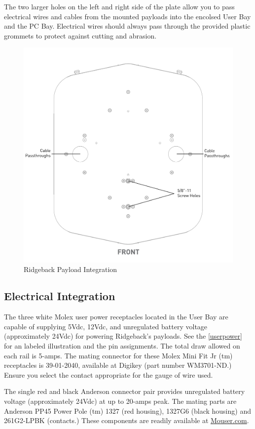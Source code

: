\documentclass[]{clearpath-latex/clearpath-manual}
\begin{document}
The two larger holes on the left and right side of the plate allow you to pass electrical wires and cables from the mounted payloads into the encolsed User Bay and the PC Bay.  Electrical wires should always pass through the provided plastic grommets to protect against cutting and abrasion.

\begin{figure}[!htb]
  \centering
  \includegraphics[width=0.75\linewidth]{Payload_Integration_Plate.pdf}
  \caption{Ridgeback Payload Integration}
  \label{payloadplate}
\end{figure}

\subsection{Electrical Integration}
\label{electrical}

The three white Molex user power receptacles located in the User Bay are capable of supplying 5Vdc, 12Vdc, and unregulated battery voltage (approximately 24Vdc) for powering Ridgeback's payloads. See the \autoref{userpower} for an labeled illustration and the pin assignments. The total draw allowed on each rail is 5-amps. The mating connector for these Molex Mini Fit Jr (tm) receptacles is 39-01-2040, available at Digikey (part number WM3701-ND.) Ensure you select the contact appropriate for the gauge of wire used.

The single red and black Anderson connector pair provides unregulated battery voltage (approximately 24Vdc) at up to 20-amps peak. The mating parts are Anderson PP45 Power Pole (tm) 1327 (red housing), 1327G6 (black housing) and 261G2-LPBK (contacts.) These components are readily available at \url{Mouser.com}.
\end{document}

